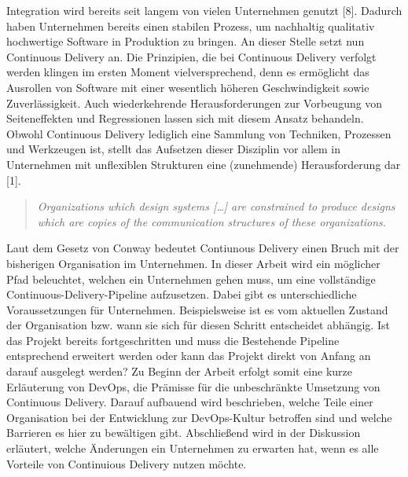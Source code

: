 
 Integration wird bereits seit langem von vielen Unternehmen genutzt [8]. Dadurch haben Unternehmen bereits einen stabilen Prozess, um nachhaltig qualitativ hochwertige Software in Produktion zu bringen. An dieser Stelle setzt nun Continuous Delivery an. Die Prinzipien, die bei Continuous Delivery verfolgt werden klingen im ersten Moment vielversprechend, denn es ermöglicht das Ausrollen von Software mit einer wesentlich höheren Geschwindigkeit sowie Zuverlässigkeit. Auch wiederkehrende Herausforderungen zur Vorbeugung von Seiteneffekten und Regressionen lassen sich mit diesem Ansatz behandeln. Obwohl Continuous Delivery lediglich eine Sammlung von Techniken, Prozessen und Werkzeugen ist, stellt das Aufsetzen dieser Disziplin vor allem in Unternehmen mit unflexiblen Strukturen eine (zunehmende) Herausforderung dar [1]. 

\begin{quote} \textit{\glqq Organizations which design systems […] are constrained to produce designs which are copies of the communication structures of these organizations. \grqq~}\cite[S.5]{Farley.2011} \end{quote} 

Laut dem Gesetz von Conway bedeutet Contiunous Delivery einen Bruch mit der bisherigen Organisation im Unternehmen. In dieser Arbeit wird ein möglicher Pfad beleuchtet, welchen ein Unternehmen gehen muss, um eine vollständige Continuous-Delivery-Pipeline aufzusetzen. Dabei gibt es unterschiedliche Voraussetzungen für Unternehmen. Beispielsweise ist es vom aktuellen Zustand der Organisation bzw. wann sie sich für diesen Schritt entscheidet abhängig. Ist das Projekt bereits fortgeschritten und muss die Bestehende Pipeline entsprechend erweitert werden oder kann das Projekt direkt von Anfang an darauf ausgelegt werden? Zu Beginn der Arbeit erfolgt somit eine kurze Erläuterung von DevOps, die Prämisse für die unbeschränkte Umsetzung von Continuous Delivery. Darauf aufbauend wird beschrieben, welche Teile einer Organisation bei der Entwicklung zur DevOps-Kultur betroffen sind und welche Barrieren es hier zu bewältigen gibt. Abschließend wird in der Diskussion erläutert, welche Änderungen ein Unternehmen zu erwarten hat, wenn es alle Vorteile von Continuious Delivery nutzen möchte.


